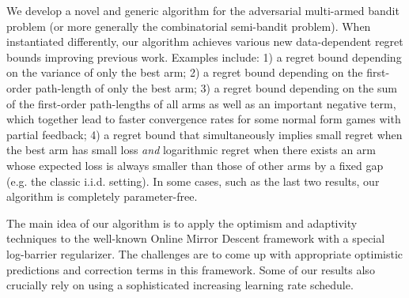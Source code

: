 We develop a novel and generic algorithm for the adversarial multi-armed bandit problem (or more generally the combinatorial semi-bandit problem).
When instantiated differently, our algorithm achieves various new data-dependent regret bounds improving previous work.
Examples include:
1) a regret bound depending on the variance of only the best arm;
2) a regret bound depending on the first-order path-length of only the best arm;
3) a regret bound depending on the sum of the first-order path-lengths of all arms as well as an important negative term, which together lead to faster convergence rates for some normal form games with partial feedback;
4) a regret bound that simultaneously implies small regret when the best arm has small loss {\it and} logarithmic regret when there exists an arm whose expected loss is always smaller than those of other arms by a fixed gap (e.g. the classic i.i.d. setting).
In some cases, such as the last two results, our algorithm is completely parameter-free.

The main idea of our algorithm is to apply the optimism and adaptivity techniques to the well-known Online Mirror Descent framework
with a special log-barrier regularizer. 
The challenges are to come up with appropriate optimistic predictions and correction terms in this framework.
Some of our results also crucially rely on using a sophisticated increasing learning rate schedule.